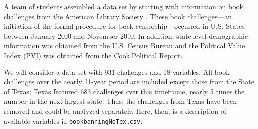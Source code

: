 \documentclass[
]{krantz}
\begin{document}
\begin{enumerate}
  A team of students assembled a data set by starting with information on book challenges from the American Library Society \citep{Fast2011}. These book challenges---an initiation of the formal procedure for book censorship---occurred in U.S. States between January 2000 and November 2010. In addition, state-level demographic information was obtained from the U.S. Census Bureau and the Political Value Index (PVI) was obtained from the Cook Political Report.

  We will consider a data set with 931 challenges and 18 variables. All book challenges over the nearly 11-year period are included except those from the State of Texas; Texas featured 683 challenges over this timeframe, nearly 5 times the number in the next largest state. Thus, the challenges from Texas have been removed and could be analyzed separately. Here, then, is a description of available variables in \texttt{bookbanningNoTex.csv}:


\end{enumerate}
\end{document}
